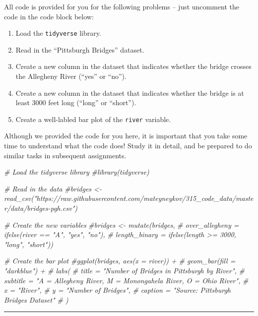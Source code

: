 \documentclass[]{article}
\newenvironment{Shaded}{\begin{snugshade}}{\end{snugshade}}
\newcommand{\CommentTok}[1]{\textcolor[rgb]{0.56,0.35,0.01}{\textit{#1}}}
\providecommand{\tightlist}{%
  \setlength{\itemsep}{0pt}\setlength{\parskip}{0pt}}
\begin{document}
All code is provided for you for the following problems -- just
uncomment the code in the code block below:

\begin{enumerate}
\def\labelenumi{\alph{enumi}.}
\tightlist
\item
  Load the \texttt{tidyverse} library.
\item
  Read in the ``Pittsburgh Bridges'' dataset.
\item
  Create a new column in the dataset that indicates whether the bridge
  crosses the Allegheny River (``yes'' or ``no'').
\item
  Create a new column in the dataset that indicates whether the bridge
  is at least 3000 feet long (``long'' or ``short'').
\item
  Create a well-labled bar plot of the \texttt{river} variable.
\end{enumerate}

Although we provided the code for you here, it is important that you
take some time to understand what the code does! Study it in detail, and
be prepared to do similar tasks in subsequent assignments.

\begin{Shaded}
\begin{Highlighting}[]
\CommentTok{# Load the tidyverse library}
\CommentTok{#library(tidyverse)}

\CommentTok{# Read in the data}
\CommentTok{#bridges <- read_csv("https://raw.githubusercontent.com/mateyneykov/315_code_data/master/data/bridges-pgh.csv")}



\CommentTok{# Create the new variables}
\CommentTok{#bridges <- mutate(bridges, }
\CommentTok{#   over_allegheny = ifelse(river ==  "A", "yes", "no"),}
\CommentTok{#   length_binary = ifelse(length >=  3000, "long", "short"))}

\CommentTok{# Create the bar plot}
\CommentTok{#ggplot(bridges, aes(x = river)) + }
\CommentTok{# geom_bar(fill = "darkblue") + }
\CommentTok{# labs(}
\CommentTok{# title = "Number of Bridges in Pittsburgh by River",}
\CommentTok{# subtitle = "A = Allegheny River, M = Monongahela River, O = Ohio River",}
\CommentTok{# x = "River",}
\CommentTok{# y = "Number of Bridges",}
\CommentTok{# caption = "Source: Pittsburgh Bridges Dataset"}
\CommentTok{# )}
\end{Highlighting}
\end{Shaded}

\begin{center}\rule{0.5\linewidth}{\linethickness}\end{center}
\end{document}
